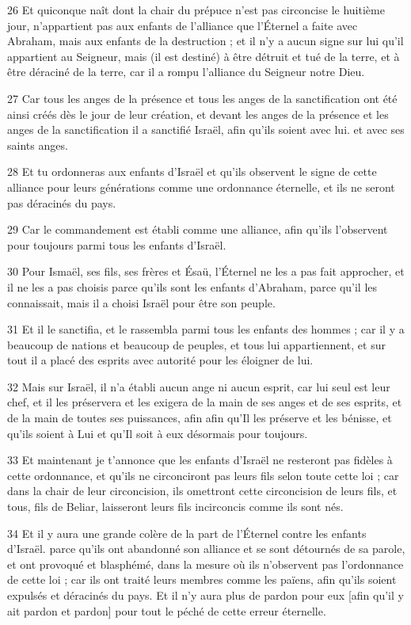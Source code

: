 \par 26 Et quiconque naît dont la chair du prépuce n'est pas circoncise le huitième jour, n'appartient pas aux enfants de l'alliance que l'Éternel a faite avec Abraham, mais aux enfants de la destruction ; et il n'y a aucun signe sur lui qu'il appartient au Seigneur, mais (il est destiné) à être détruit et tué de la terre, et à être déraciné de la terre, car il a rompu l'alliance du Seigneur notre Dieu.
\par 27 Car tous les anges de la présence et tous les anges de la sanctification ont été ainsi créés dès le jour de leur création, et devant les anges de la présence et les anges de la sanctification il a sanctifié Israël, afin qu'ils soient avec lui. et avec ses saints anges.
\par 28 Et tu ordonneras aux enfants d'Israël et qu'ils observent le signe de cette alliance pour leurs générations comme une ordonnance éternelle, et ils ne seront pas déracinés du pays.
\par 29 Car le commandement est établi comme une alliance, afin qu'ils l'observent pour toujours parmi tous les enfants d'Israël.
\par 30 Pour Ismaël, ses fils, ses frères et Ésaü, l'Éternel ne les a pas fait approcher, et il ne les a pas choisis parce qu'ils sont les enfants d'Abraham, parce qu'il les connaissait, mais il a choisi Israël pour être son peuple.
\par 31 Et il le sanctifia, et le rassembla parmi tous les enfants des hommes ; car il y a beaucoup de nations et beaucoup de peuples, et tous lui appartiennent, et sur tout il a placé des esprits avec autorité pour les éloigner de lui.
\par 32 Mais sur Israël, il n'a établi aucun ange ni aucun esprit, car lui seul est leur chef, et il les préservera et les exigera de la main de ses anges et de ses esprits, et de la main de toutes ses puissances, afin afin qu'Il les préserve et les bénisse, et qu'ils soient à Lui et qu'Il soit à eux désormais pour toujours.
\par 33 Et maintenant je t'annonce que les enfants d'Israël ne resteront pas fidèles à cette ordonnance, et qu'ils ne circonciront pas leurs fils selon toute cette loi ; car dans la chair de leur circoncision, ils omettront cette circoncision de leurs fils, et tous, fils de Beliar, laisseront leurs fils incirconcis comme ils sont nés.
\par 34 Et il y aura une grande colère de la part de l'Éternel contre les enfants d'Israël. parce qu'ils ont abandonné son alliance et se sont détournés de sa parole, et ont provoqué et blasphémé, dans la mesure où ils n'observent pas l'ordonnance de cette loi ; car ils ont traité leurs membres comme les païens, afin qu'ils soient expulsés et déracinés du pays. Et il n’y aura plus de pardon pour eux [afin qu’il y ait pardon et pardon] pour tout le péché de cette erreur éternelle.

